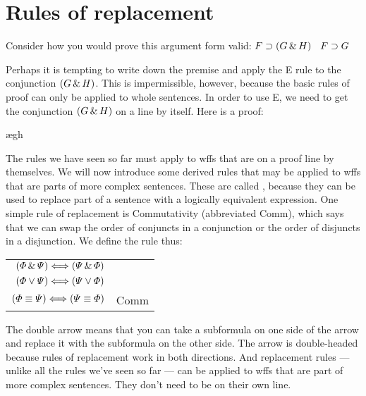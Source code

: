 \section{Rules of replacement}

Consider how you would prove this argument form valid: $F\supset(G\,\&\, H)$ \therefore\ $F\supset G$

Perhaps it is tempting to write down the premise and apply the {\eand}E rule to the conjunction $(G \,\&\, H)$. This is impermissible, however, because the basic rules of proof can only be applied to whole sentences. In order to use {\eand}E, we need to get the conjunction $(G \,\&\, H)$ on a line by itself. Here is a proof:

\begin{ndproof}
	\open
		\ae{gh}
	\close
\end{ndproof}

The rules we have seen so far must apply to wffs that are on a proof line by themselves. We will now introduce some derived rules that may be applied to wffs that are parts of more complex sentences. These are called , because they can be used to replace part of a sentence with a logically equivalent expression. One simple rule of replacement is Commutativity (abbreviated Comm), which says that we can swap the order of conjuncts in a conjunction or the order of disjuncts in a disjunction. We define the rule thus:

\begin{center}
\begin{tabular}{rl}
$(\varPhi{}\,\&\,\varPsi{}) \Longleftrightarrow (\varPsi{}\,\&\,\varPhi{})$\\
$(\varPhi{}\vee\varPsi{}) \Longleftrightarrow (\varPsi{}\vee\varPhi{})$\\
$(\varPhi{}\equiv\varPsi{}) \Longleftrightarrow (\varPsi{}\equiv\varPhi{})$
& Comm
\end{tabular}
\end{center}

The double arrow means that you can take a subformula on one side of the arrow and replace it with the subformula on the other side. The arrow is double-headed because rules of replacement work in both directions. And replacement rules --- unlike all the rules we've seen so far --- can be applied to wffs that are part of more complex sentences. They don't need to be on their own line.

